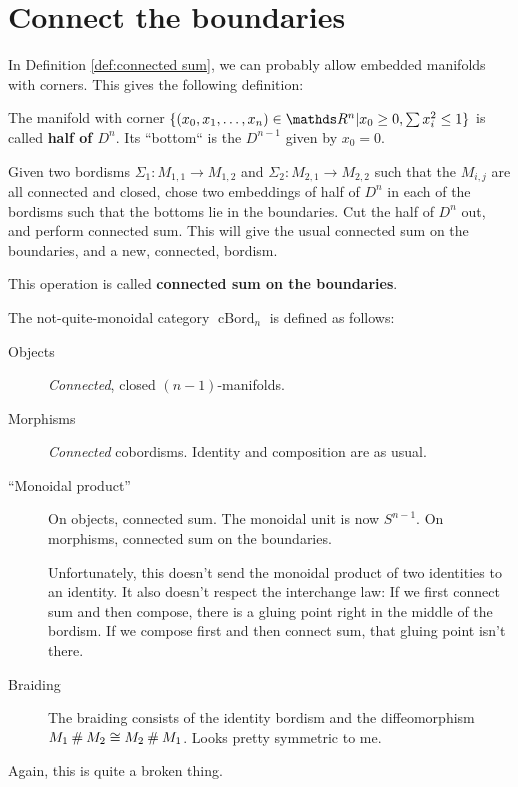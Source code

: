 \documentclass[a4paper]{article}
\begin{document}
\section{Connect the boundaries}
\label{sec:connect boundaries}

In Definition \ref{def:connected sum},
we can probably allow embedded manifolds with corners.
This gives the following definition:
\begin{definition}
	The manifold with corner $\{(x_0, x_1, \dots, x_n) \in \R^n | x_0 \geq 0, \sum x_i^2 \leq 1 \}$
	is called \textbf{half of $D^n$}.
	Its ``bottom`` is the $D^{n-1}$ given by $x_0 = 0$.

	Given two bordisms $\Sigma_1\colon M_{1,1} \to M_{1,2}$ and $\Sigma_2\colon M_{2,1} \to M_{2,2}$
	such that the $M_{i,j}$ are all connected and closed,
	chose two embeddings of half of $D^n$ in each of the bordisms such that the bottoms lie in the boundaries.
	Cut the half of $D^n$ out,
	and perform connected sum.
	This will give the usual connected sum on the boundaries,
	and a new, connected, bordism.
	
	This operation is called \textbf{connected sum on the boundaries}.
\end{definition}
\begin{definition}
	The not-quite-monoidal category $\operatorname{cBord}_n$ is defined as follows:
	\begin{description}
		\item[Objects]
			\emph{Connected}, closed $(n-1)$-manifolds.
		\item[Morphisms]
			\emph{Connected} cobordisms.
			Identity and composition are as usual.
		\item[``Monoidal product'']
			On objects, connected sum.
			The monoidal unit is now $S^{n-1}$.
			On morphisms, connected sum on the boundaries.
			
			Unfortunately, this doesn't send the monoidal product of two identities to an identity.
			It also doesn't respect the interchange law:
			If we first connect sum and then compose,
			there is a gluing point right in the middle of the bordism.
			If we compose first and then connect sum,
			that gluing point isn't there.
		\item[Braiding]
			The braiding consists of the identity bordism and the diffeomorphism $M_1 \mathbin{\#} M_2 \cong M_2 \mathbin{\#} M_1$.
			Looks pretty symmetric to me.
	\end{description}
\end{definition}
Again, this is quite a broken thing.
\end{document}
